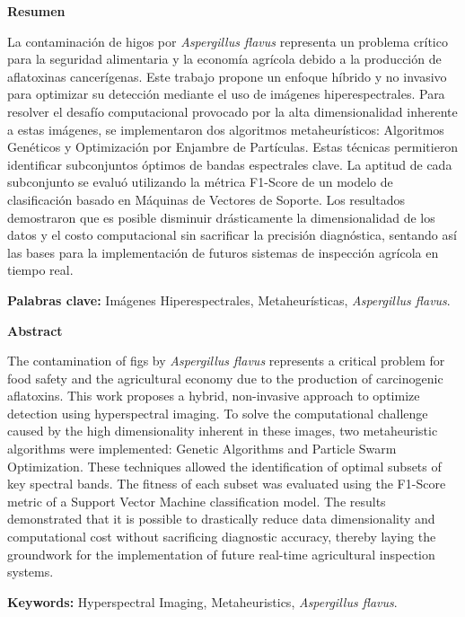 \thispagestyle{plain}  
\vspace{0.9cm}
\textbf{{\Large Resumen}}
\vspace{0.9cm}

La contaminación de higos por \textit{Aspergillus flavus} representa un problema crítico para la seguridad alimentaria y la economía agrícola debido a la producción de aflatoxinas cancerígenas. Este trabajo propone un enfoque híbrido y no invasivo para optimizar su detección mediante el uso de imágenes hiperespectrales. Para resolver el desafío computacional provocado por la alta dimensionalidad inherente a estas imágenes, se implementaron dos algoritmos metaheurísticos: Algoritmos Genéticos y Optimización por Enjambre de Partículas. Estas técnicas permitieron identificar subconjuntos óptimos de bandas espectrales clave. La aptitud de cada subconjunto se evaluó utilizando la métrica F1-Score de un modelo de clasificación basado en Máquinas de Vectores de Soporte. Los resultados demostraron que es posible disminuir drásticamente la dimensionalidad de los datos y el costo computacional sin sacrificar la precisión diagnóstica, sentando así las bases para la implementación de futuros sistemas de inspección agrícola en tiempo real.

\vspace{0.9cm}
\textbf{Palabras clave:} Imágenes Hiperespectrales, Metaheurísticas, \textit{Aspergillus flavus}.

\newpage

\thispagestyle{plain}  
\vspace{0.9cm}
\textbf{{\Large Abstract}}
\vspace{0.9cm}

The contamination of figs by \textit{Aspergillus flavus} represents a critical problem for food safety and the agricultural economy due to the production of carcinogenic aflatoxins. This work proposes a hybrid, non-invasive approach to optimize detection using hyperspectral imaging. To solve the computational challenge caused by the high dimensionality inherent in these images, two metaheuristic algorithms were implemented: Genetic Algorithms and Particle Swarm Optimization. These techniques allowed the identification of optimal subsets of key spectral bands. The fitness of each subset was evaluated using the F1-Score metric of a Support Vector Machine classification model. The results demonstrated that it is possible to drastically reduce data dimensionality and computational cost without sacrificing diagnostic accuracy, thereby laying the groundwork for the implementation of future real-time agricultural inspection systems.

\vspace{0.9cm}
\textbf{Keywords:} Hyperspectral Imaging, Metaheuristics, \textit{Aspergillus flavus}.
